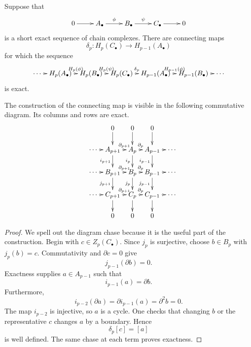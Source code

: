 \begin{theorem}
\label{at-theorem-long-exact-homology}
Suppose that
$$
\xymatrix{
0 \ar[r]
  & A_\bullet \ar[r]^-\phi
  & B_\bullet \ar[r]^-\psi
  & C_\bullet \ar[r]
  & 0
}
$$
is a short exact sequence of chain
complexes.  There are connecting maps
$$
\delta_p:H_p(C_\bullet)
\longrightarrow H_{p-1}(A_\bullet)
$$
for which the sequence
$$
\xymatrix@C=.55em{
\cdots \ar[r]
  & H_p(A_\bullet)
    \ar[r]^-{H_p(\phi)}
  & H_p(B_\bullet)
    \ar[r]^-{H_p(\psi)}
  & H_p(C_\bullet)
    \ar[r]^-{\delta_p}
  & H_{p-1}(A_\bullet)
    \ar[r]^-{H_{p-1}(\phi)}
  & H_{p-1}(B_\bullet)
    \ar[r]
  & \cdots
}
$$
is exact.
\end{theorem}

\noindent
The construction of the connecting map is
visible in the following commutative
diagram.  Its columns and rows are exact.
$$
\xymatrix@C=.55em@R=1.7em{
  & & 0 \ar[d]
    & 0 \ar[d]
    & 0 \ar[d] \\
  & \cdots \ar[r]
    & A_{p+1}
      \ar[r]^-{\partial_{p+1}}
      \ar[d]_{i_{p+1}}
    & A_p
      \ar[r]^-{\partial_p}
      \ar[d]_{i_p}
    & A_{p-1}
      \ar[r]
      \ar[d]_{i_{p-1}}
    & \cdots \\
  & \cdots \ar[r]
    & B_{p+1}
      \ar[r]^-{\partial_{p+1}}
      \ar[d]_{j_{p+1}}
    & B_p
      \ar[r]^-{\partial_p}
      \ar[d]_{j_p}
    & B_{p-1}
      \ar[r]
      \ar[d]_{j_{p-1}}
    & \cdots \\
  & \cdots \ar[r]
    & C_{p+1}
      \ar[r]^-{\partial_{p+1}}
      \ar[d]
    & C_p
      \ar[r]^-{\partial_p}
      \ar[d]
    & C_{p-1}
      \ar[r]
      \ar[d]
    & \cdots \\
  & & 0 & 0 & 0
}
$$

\begin{proof}
We spell out the diagram chase because it
is the useful part of the construction.
Begin with $c\in Z_p(C_\bullet)$.  Since
$j_p$ is surjective, choose $b\in B_p$
with $j_p(b)=c$.  Commutativity and
$\partial c=0$ give
$$
j_{p-1}(\partial b)=0.
$$
Exactness supplies $a\in A_{p-1}$ such
that
$$
i_{p-1}(a)=\partial b.
$$
Furthermore,
$$
i_{p-2}(\partial a)
=
\partial i_{p-1}(a)
=
\partial^2b
=0.
$$
The map $i_{p-2}$ is injective, so $a$ is
a cycle.  One checks that changing $b$ or
the representative $c$ changes $a$ by a
boundary.  Hence
$$
\delta_p[c]=[a]
$$
is well defined.  The same chase at each
term proves exactness.
\end{proof}

